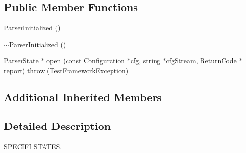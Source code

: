 \subsection*{Public Member Functions}
\begin{DoxyCompactItemize}
\item 
\hyperlink{classit_1_1testbench_1_1parser_1_1ParserInitialized_a9ba7408d52c226b1f12c3ab554e19321}{Parser\-Initialized} ()
\item 
\hyperlink{classit_1_1testbench_1_1parser_1_1ParserInitialized_a46bb674c53e8c446074dab5c09f9ff7f}{$\sim$\-Parser\-Initialized} ()
\item 
\hyperlink{classit_1_1testbench_1_1parser_1_1ParserState}{Parser\-State} $\ast$ \hyperlink{classit_1_1testbench_1_1parser_1_1ParserInitialized_a4c5e395ca0be2a58cf6351d30f69e3be}{open} (const \hyperlink{structit_1_1testbench_1_1data_1_1Configuration}{Configuration} $\ast$cfg, string $\ast$cfg\-Stream, \hyperlink{structit_1_1testbench_1_1data_1_1ReturnCode}{Return\-Code} $\ast$report)  throw (\-Test\-Framework\-Exception)
\end{DoxyCompactItemize}
\subsection*{Additional Inherited Members}


\subsection{Detailed Description}
S\-P\-E\-C\-I\-F\-I S\-T\-A\-T\-E\-S. 

